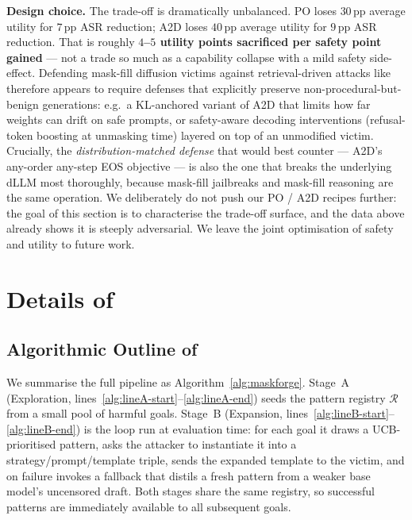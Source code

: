 \textbf{Design choice.}
The trade-off is dramatically unbalanced. PO loses $30$\,pp average
utility for $7$\,pp ASR reduction; A2D loses $40$\,pp average utility
for $9$\,pp ASR reduction. That is roughly \textbf{$4$--$5$ utility points
sacrificed per safety point gained} --- not a trade so much as a
capability collapse with a mild safety side-effect. Defending mask-fill
diffusion victims against retrieval-driven attacks like \method
therefore appears to require defenses that explicitly preserve
non-procedural-but-benign generations: e.g.\ a KL-anchored variant of
A2D that limits how far weights can drift on safe prompts, or
safety-aware decoding interventions (refusal-token boosting at unmasking
time) layered on top of an unmodified victim. Crucially, the
\emph{distribution-matched defense} that would best counter \method ---
A2D's any-order any-step EOS objective --- is also the one that breaks
the underlying dLLM most thoroughly, because mask-fill jailbreaks and
mask-fill reasoning are the same operation. We deliberately do not push
our PO / A2D recipes further: the goal of this section is to characterise
the trade-off surface, and the data above already shows it is steeply
adversarial. We leave the joint optimisation of safety and utility to
future work.

\section{Details of \method}\label{appd:method}

\subsection{Algorithmic Outline of \method}\label{appd:algo}
We summarise the full \method pipeline as Algorithm~\ref{alg:maskforge}. Stage~A
(Exploration, lines~\ref{alg:lineA-start}--\ref{alg:lineA-end}) seeds the
pattern registry $\mathcal{R}$ from a small pool of harmful goals. Stage~B
(Expansion, lines~\ref{alg:lineB-start}--\ref{alg:lineB-end}) is the loop run
at evaluation time: for each goal it draws a UCB-prioritised pattern, asks the
attacker to instantiate it into a strategy/prompt/template triple, sends the
expanded template to the victim, and on failure invokes a fallback that
distils a fresh pattern from a weaker base model's uncensored draft. Both
stages share the same registry, so successful patterns are immediately
available to all subsequent goals.


